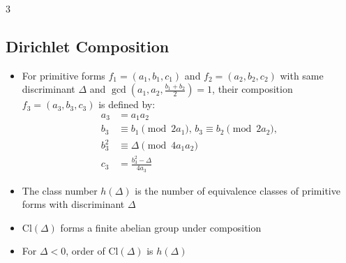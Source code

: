 \documentclass[8,a4paper]{article}
\begin{document}
\begin{multicols}{3}
	\subsection{Dirichlet Composition}
	\begin{itemize}[leftmargin=*, nosep]
		\item For primitive forms $f_1=(a_1,b_1,c_1)$ and $f_2=(a_2,b_2,c_2)$ with same discriminant $\Delta$ and $\gcd(a_1,a_2,\frac{b_1+b_2}{2})=1$, their composition $f_3=(a_3,b_3,c_3)$ is defined by:
		      \begin{align*}
			      a_3 & = a_1a_2                                               \\
			      b_3 & \equiv b_1 \pmod{2a_1}, \, b_3 \equiv b_2 \pmod{2a_2}, \\ b_3^2 &\equiv \Delta \pmod{4a_1a_2} \\
			      c_3 & = \frac{b_3^2-\Delta}{4a_3}
		      \end{align*}
		\item The class number $h(\Delta)$ is the number of equivalence classes of primitive forms with discriminant $\Delta$
		\item $\text{Cl}(\Delta)$ forms a finite abelian group under composition
		\item For $\Delta < 0$, order of $\text{Cl}(\Delta)$ is $h(\Delta)$
	\end{itemize}

\end{multicols}
\end{document}
